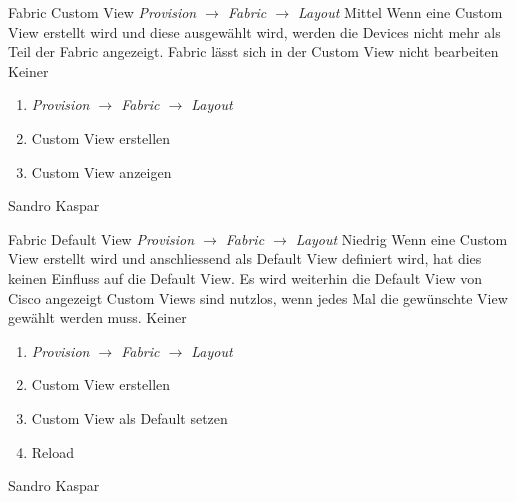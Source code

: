 \bugreport
{Fabric Custom View}
{\textit{ Provision $\rightarrow$ Fabric $\rightarrow$ Layout}}
{Mittel}
{Wenn eine Custom View erstellt wird und diese ausgewählt wird, werden die Devices nicht mehr als Teil der Fabric angezeigt. 
}
{Fabric lässt sich in der Custom View nicht bearbeiten}
{Keiner}
{
	\begin{enumerate}
		\item \textit{Provision $\rightarrow$ Fabric $\rightarrow$ Layout}
		\item Custom View erstellen
		\item Custom View anzeigen
	\end{enumerate}
}
{Sandro Kaspar}
{}

\bugreport
{Fabric Default View}
{\textit{ Provision $\rightarrow$ Fabric $\rightarrow$ Layout}}
{Niedrig}
{Wenn eine Custom View erstellt wird und anschliessend als Default View definiert wird, hat dies keinen Einfluss auf die Default View. Es wird weiterhin die Default View von Cisco angezeigt
}
{Custom Views sind nutzlos, wenn jedes Mal die gewünschte View gewählt werden muss.}
{Keiner}
{
	\begin{enumerate}
		\item \textit{Provision $\rightarrow$ Fabric $\rightarrow$ Layout}
		\item Custom View erstellen
		\item Custom View als Default setzen
		\item Reload
	\end{enumerate}
}
{Sandro Kaspar}
{}